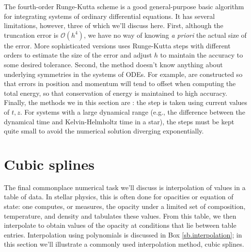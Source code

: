 The fourth-order Runge-Kutta scheme is a good general-purpose basic algorithm for integrating systems of ordinary differential equations. It has several limitations, however, three of which we'll discuss here. First, although the truncation error is $\mathcal{O}(h^{4})$, we have no way of knowing \emph{a priori} the actual size of the error. More sophisticated versions uses Runge-Kutta steps with different orders to estimate the size of the error and adjust $h$ to maintain the accuracy to some desired tolerance. Second, the method doesn't know anything about underlying symmetries in the systems of ODEs. For example,  are constructed so that errors in position and momentum will tend to offset when computing the total energy, so that conservation of energy is maintained to high accuracy. Finally, the methods we in this section are : the step is taken using current values of $t,z$. For systems with a large dynamical range (e.g., the difference between the dynamical time and Kelvin-Helmholtz time in a star), the steps must be kept quite small to avoid the numerical solution diverging exponentially.

\section{Cubic splines}
The final commonplace numerical task we'll discuss is interpolation of values in a table of data. In stellar physics, this is often done for opacities or equation of state: one computes, or measures, the opacity under a limited set of composition, temperature, and density and tabulates these values. From this table, we then interpolate to obtain values of the opacity at conditions that lie between table entries. Interpolation using polynomials is discussed in Box \ref{sb.interpolation}; in this section we'll illustrate a commonly used interpolation method, cubic splines.

